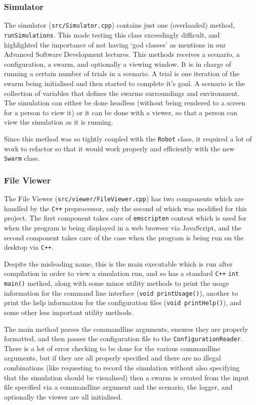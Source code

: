 \documentclass[11pt,a4paper]{article}
\begin{document}
\subsubsection{Simulator}
The simulator (\texttt{src/Simulator.cpp}) contains just one (overloaded)
method, \texttt{runSimulations}. This made testing this class exceedingly
difficult, and highlighted the importance of not having `god classes' as
mentions in our Advanced Software Development lectures. This methods receives a
scenario, a configuration, a swarm, and optionally a viewing window. It is in
charge of running a certain number of trials in a scenario. A trial is one
iteration of the swarm being initialised and then started to complete it's
goal. A scenario is the collection of variables that defines the swarms
surroundings and environment. The simulation can either be done headless
(without being rendered to a screen for a person to view it) or it can be done
with a viewer, so that a person can view the simulation as it is running.

Since this method was so tightly coupled with the \texttt{Robot} class, it
required a lot of work to refactor so that it would work properly and
efficiently with the new \texttt{Swarm} class.


\subsubsection{File Viewer}
The File Viewer (\texttt{src/viewer/FileViewer.cpp}) has two components which
are handled by the \texttt{C++} preprocessor, only the second of which was
modified for this project. The first component takes care of \texttt{emscripten}
content which is used for when the program is being displayed in a web browser
via JavaScript, and the second component takes care of the case when the
program is being run on the desktop via \texttt{C++}. 

Despite the misleading name, this is the main executable which is run after
compilation in order to view a simulation run, and so has a standard
\texttt{C++} \texttt{int main()} method, along with some minor utility methods
to print the usage information for the command line interface (\texttt{void
printUsage()}), another to print the help information for the configuration
files (\texttt{void printHelp()}), and some other less important utility
methods.

The main method parses the commandline arguments, ensures they are properly
formatted, and then passes the configuration file to the
\texttt{ConfigurationReader}. There is a lot of error checking to be done for
the various commandline arguments, but if they are all properly specified and
there are no illegal combinations (like requesting to record the simulation
without also specifying that the simulation should be visualised) then a swarm
is created from the input file specified via a commandline argument and the
scenario, the logger, and optionally the viewer are all initialised.
\end{document}
